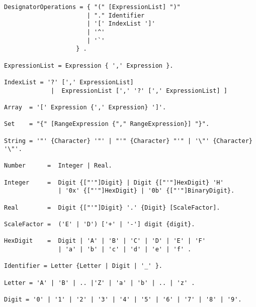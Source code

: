 \documentclass[a4wide,11pt]{article}
\begin{document}
\begin{lstlisting}[style=EBNF]
DesignatorOperations = { "(" [ExpressionList] ")"
                       | "." Identifier
                       | '[' IndexList ']'
                       | '^'
                       | '`'
                    } .
                    
ExpressionList = Expression { ',' Expression }.

IndexList = '?' [',' ExpressionList]
             |  ExpressionList [',' '?' [',' ExpressionList] ]

Array  = '[' Expression {',' Expression} ']'.

Set    = "{" [RangeExpression {"," RangeExpression}] "}".

String = '"' {Character} '"' | "'" {Character} "'" | '\"' {Character} '\"'.

Number      =  Integer | Real.

Integer     =  Digit {["'"]Digit} | Digit {["'"]HexDigit} 'H' 
               | '0x' {["'"]HexDigit} | '0b' {["'"]BinaryDigit}.

Real        =  Digit {["'"]Digit} '.' {Digit} [ScaleFactor].

ScaleFactor =  ('E' | 'D') ['+' | '-'] digit {digit}.

HexDigit    =  Digit | 'A' | 'B' | 'C' | 'D' | 'E' | 'F' 
               | 'a' | 'b' | 'c' | 'd' | 'e' | 'f' .

Identifier = Letter {Letter | Digit | '_' }.

Letter = 'A' | 'B' | .. |'Z' | 'a' | 'b' | .. | 'z' .

Digit = '0' | '1' | '2' | '3' | '4' | '5' | '6' | '7' | '8' | '9'.
\end{lstlisting}
\end{document}
